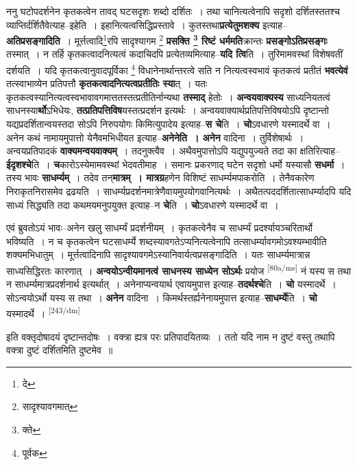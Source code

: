 \documentclass[article,12pt,a4paper]{memoir}
\begin{document}
	  \pstart ननु घटोपदर्शनेन कृतकत्वेन तावद् घटसदृशः शब्दो दर्शितः । तथा चानित्यत्वेनापि सदृशो दर्शितस्ततश्च व्याप्तिर्दर्शितैवेत्याह--इहेति । इहानित्यत्वसिद्धिप्रस्तावे । कुतस्तथा\textbf{प्रत्येतुमशक्य} इत्याह--\textbf{अतिप्रसङ्गादिति} । मूर्त्तत्वादि\footnote{दे}रपि सादृश्यागम \footnote{सादृश्यावगमात्} \textbf{प्रसक्ति \footnote{क्ते} रिष्टं धर्ममति}क्रान्तः \textbf{प्रसङ्गोऽतिप्रसङ्गः} तस्मात् । न तर्हि कृतकत्वादनित्यत्वं कदाचिदपि प्रत्येतव्यमित्याह--\textbf{यदि त्वि}ति । तुरिमामवस्थां विशेषवतीं दर्शयति । यदि कृतकत्वानुवादपूर्विका \footnote{पूर्वक} विधानेनार्थान्तरत्वे सति न नित्यत्वस्वभावं कृतकत्वं प्रतीतं \textbf{भवत्येवं} तत्स्वाभाव्येन प्रतिपत्तौ \textbf{कृतकत्वादनित्यत्वप्रतीतिः स्या}त् । यतः कृतकत्वस्यानित्यत्वस्वभावावगमात्ततस्तत्प्रतीतिर्नान्यथा \textbf{तस्माद्} हेतोः । \textbf{अन्वयवाक्यस्य} साध्यनियतत्वं साधनस्या\textbf{र्थो}ऽभिधेयः, \textbf{तत्प्रतिपत्तिविष}यस्तत्प्रदर्शन इत्यर्थः । अन्वयवाक्यार्थप्रतिपत्तिविषयोऽपि दृष्टान्तो यद्यप्रदर्शितान्वयस्तदा सोऽपि निरुपयोगः किमित्युपादेय इत्याह--\textbf{स चे}ति । \textbf{चो}ऽवधारणे यस्मादर्थे वा । अनेन कथं नामायमुपात्तो येनैवमभिधीयत इत्याह--\textbf{अनेनेति । अनेन} वादिना । तुर्विशेषार्थः । अन्वयप्रतिपादकं \textbf{वाक्यमन्वयवाक्यम्} । तदनुक्त्वैव । अथैवमुपात्तोऽपि यद्युपयुज्यते तदा का क्षतिरित्याह--\textbf{ईदृशश्चे}ति । \textbf{च}कारोऽस्येमामवस्थां भेदवतीमाह । समानः प्रकरणाद् घटेन सदृशो धर्मो यस्यासौ \textbf{सधर्मा} । तस्य भावः \textbf{साधर्म्यम्} । तदेव तन्\textbf{मात्रम् । मात्रग्र}हणेन विशिष्टं साधर्म्यमपाकरोति । तेनैवकारेण निराकृतनिरासमेव द्रढयति । साधर्म्यप्रदर्शनमात्रेणैवायमुपयोगवानित्यर्थः । अथैतत्पददर्शितात्साधर्म्यादपि यदि साध्यं सिद्ध्यति तदा कथमयमनुपयुक्त इत्याह--न \textbf{चे}ति । \textbf{चो}ऽवधारणे यस्मादर्थे वा ।
	\pend
      

	  \pstart एवं ब्रुवतोऽयं भावः--अनेन खलु साधर्म्यं प्रदर्शनीयम् । कृतकत्वेनैव च साधर्म्यं प्रदर्श्यायञ्चरितार्थो भविष्यति । न च कृतकत्वेन घटसाधर्म्ये शब्दस्यावगतेऽप्यनित्यत्वेनापि तत्साधर्म्यावगमोऽवश्यम्भावीति शक्यमभिधातुम् । मूर्त्तत्वादिनापि सादृश्यावगमेऽस्यानिवार्यत्वप्रसङ्गादिति । यतः साधर्म्यमात्रान्न साध्यसिद्धिरतः कारणात् । \textbf{अन्वयोऽन्वीयमानत्वं साधनस्य साध्येन सोऽर्थः} प्रयोज \leavevmode\textsuperscript{\rmlatinfont\tiny [80a/ms]} नं यस्य स तथा न साधर्म्यमात्रप्रदर्शनार्थ इत्यर्थात् । अनेनाप्यन्वयार्थ एवायमुपात्त इत्याह--\textbf{तदर्थश्चे}ति । \textbf{चो} यस्मादर्थे । सोऽन्वयोऽर्थो यस्य स तथा । \textbf{अनेन} वादिना । किमर्थस्तर्ह्यनेनायमुपात्त इत्याह--\textbf{साधर्म्ये}ति । \textbf{चो} यस्मादर्थे ।  \leavevmode\textsuperscript{\rmlatinfont\tiny [243/dm]} 
	  
	इति वक्तृदोषादयं दृष्टान्तदोषः । वक्त्रा ह्यत्र परः प्रतिपादयितव्यः । ततो यदि नाम न दुष्टं वस्तु तथापि वक्त्रा दुष्टं दर्शितमिति दुष्टमेव ॥ 
	  
\end{document}
